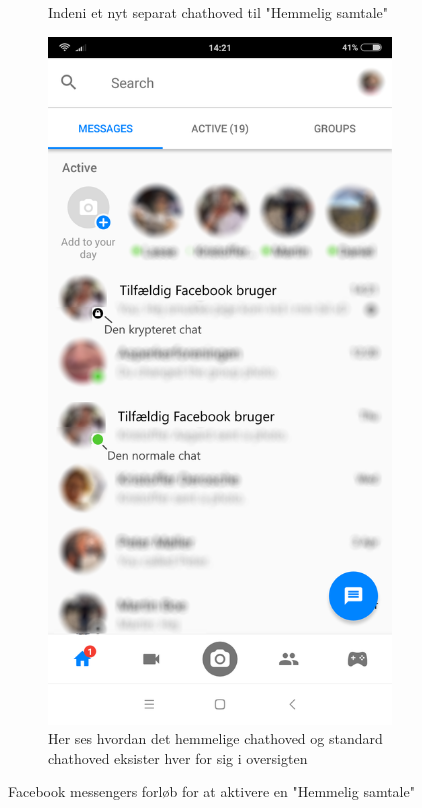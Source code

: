 \begin{figure}[H]
\begin{center}
\begin{subfigure}{0.33\textwidth}
            \caption{Indeni et nyt separat chathoved til "Hemmelig samtale"}
            \label{fig:facebookchat4}
        \end{subfigure}
        \begin{subfigure}{0.33\textwidth}
            \centering
            \includegraphics[scale=0.15]{Projectdoc/Problemanalyse/Illustrationer/5-fbchat.png} 
            \caption{Her ses hvordan det hemmelige chathoved og standard chathoved eksister hver for sig i oversigten}
            \label{fig:facebookchat5}
        \end{subfigure}
    \end{center}
    \caption{Facebook messengers forløb for at aktivere en "Hemmelig samtale"}
    \label{fig:facebookchat}
\end{figure}
